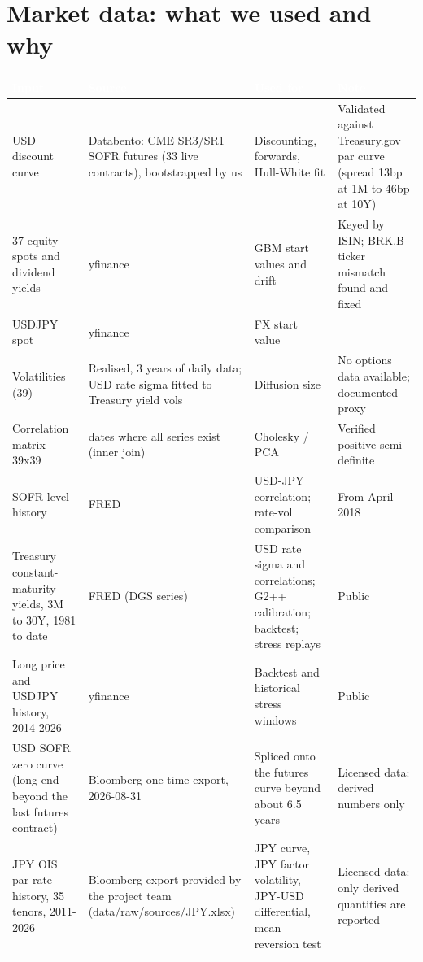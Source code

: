\documentclass[11pt,letterpaper]{article}
\begin{document}
\section{Market data: what we used and why}
{\scriptsize\setlength{\LTpre}{4pt}\setlength{\LTpost}{6pt}
\begin{longtable}{>{\raggedright\arraybackslash}p{}>{\raggedright\arraybackslash}p{}>{\raggedright\arraybackslash}p{}>{\raggedright\arraybackslash}p{}}
\toprule
\rowcolor{navy}\textbf{\textcolor{white}{Input}} & \textbf{\textcolor{white}{Source}} & \textbf{\textcolor{white}{Used for}} & \textbf{\textcolor{white}{Note}} \\
\endhead
USD discount curve & Databento: CME SR3/SR1 SOFR futures (33 live contracts), bootstrapped by us & Discounting, forwards, Hull-White fit & Validated against Treasury.gov par curve (spread 13bp at 1M to 46bp at 10Y) \\
\rowcolor{gray!9}37 equity spots and dividend yields & yfinance & GBM start values and drift & Keyed by ISIN; BRK.B ticker mismatch found and fixed \\
USDJPY spot & yfinance & FX start value &  \\
\rowcolor{gray!9}Volatilities (39) & Realised, 3 years of daily data; USD rate sigma fitted to Treasury yield vols & Diffusion size & No options data available; documented proxy \\
Correlation matrix 39x39 & 616 dates where all series exist (inner join) & Cholesky / PCA & Verified positive semi-definite \\
\rowcolor{gray!9}SOFR level history & FRED & USD-JPY correlation; rate-vol comparison & From April 2018 \\
Treasury constant-maturity yields, 3M to 30Y, 1981 to date & FRED (DGS series) & USD rate sigma and correlations; G2++ calibration; backtest; stress replays & Public \\
\rowcolor{gray!9}Long price and USDJPY history, 2014-2026 & yfinance & Backtest and historical stress windows & Public \\
USD SOFR zero curve (long end beyond the last futures contract) & Bloomberg one-time export, 2026-08-31 & Spliced onto the futures curve beyond about 6.5 years & Licensed data: derived numbers only \\
\rowcolor{gray!9}JPY OIS par-rate history, 35 tenors, 2011-2026 & Bloomberg export provided by the project team (data/raw/sources/JPY.xlsx) & JPY curve, JPY factor volatility, JPY-USD differential, mean-reversion test & Licensed data: only derived quantities are reported \\

\end{longtable}}
\end{document}
